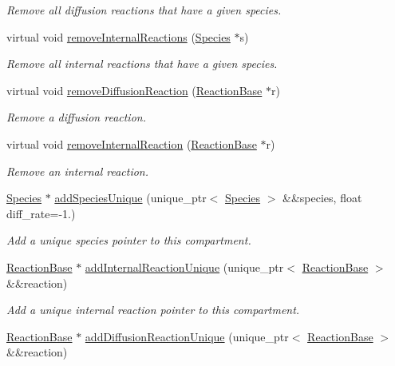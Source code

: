 \begin{DoxyCompactItemize}
\begin{DoxyCompactList}\small\item\em Remove all diffusion reactions that have a given species. \end{DoxyCompactList}\item 
virtual void \hyperlink{classCompartment_a2a72730670bbec0024b6aea007171bd4}{remove\+Internal\+Reactions} (\hyperlink{classSpecies}{Species} $\ast$s)
\begin{DoxyCompactList}\small\item\em Remove all internal reactions that have a given species. \end{DoxyCompactList}\item 
virtual void \hyperlink{classCompartment_a45ae8192f43b509da4c41b0fccd79522}{remove\+Diffusion\+Reaction} (\hyperlink{classReactionBase}{Reaction\+Base} $\ast$r)
\begin{DoxyCompactList}\small\item\em Remove a diffusion reaction. \end{DoxyCompactList}\item 
virtual void \hyperlink{classCompartment_a44d0d42e7fa397e5e35a8af6adc02344}{remove\+Internal\+Reaction} (\hyperlink{classReactionBase}{Reaction\+Base} $\ast$r)
\begin{DoxyCompactList}\small\item\em Remove an internal reaction. \end{DoxyCompactList}\item 
\hyperlink{classSpecies}{Species} $\ast$ \hyperlink{classCompartment_ae402cb5f64922f3d82b317faddf2d7f6}{add\+Species\+Unique} (unique\+\_\+ptr$<$ \hyperlink{classSpecies}{Species} $>$ \&\&species, float diff\+\_\+rate=-\/1.)
\begin{DoxyCompactList}\small\item\em Add a unique species pointer to this compartment. \end{DoxyCompactList}\item 
\hyperlink{classReactionBase}{Reaction\+Base} $\ast$ \hyperlink{classCompartment_af610f5e8a1ba23fa026f301ccfef6e19}{add\+Internal\+Reaction\+Unique} (unique\+\_\+ptr$<$ \hyperlink{classReactionBase}{Reaction\+Base} $>$ \&\&reaction)
\begin{DoxyCompactList}\small\item\em Add a unique internal reaction pointer to this compartment. \end{DoxyCompactList}\item 
\hyperlink{classReactionBase}{Reaction\+Base} $\ast$ \hyperlink{classCompartment_adb22adbaf1306410febd59d752ea0f90}{add\+Diffusion\+Reaction\+Unique} (unique\+\_\+ptr$<$ \hyperlink{classReactionBase}{Reaction\+Base} $>$ \&\&reaction)

\end{DoxyCompactItemize}
